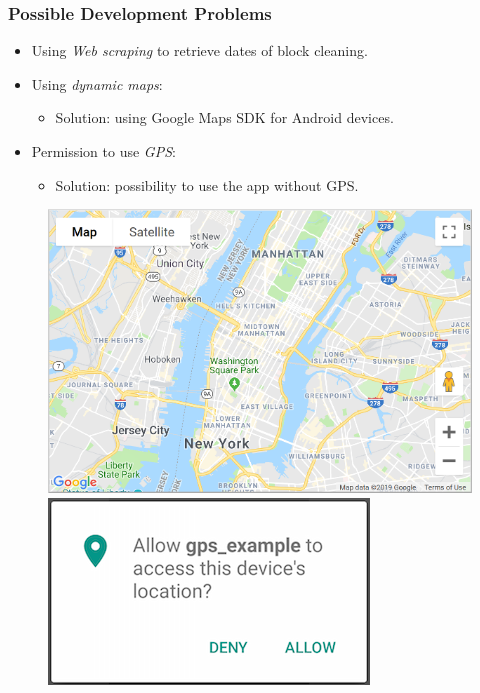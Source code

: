 \documentclass[10pt,xcolor=pdflatex,hyperref={unicode}]{beamer}
\begin{document}
\begin{frame}\frametitle{Possible Development Problems}
    \doublespacing
    \begin{itemize}
        \item Using \emph{Web scraping} to retrieve dates of block cleaning.
        \item Using \emph{dynamic maps}:
            \begin{itemize}
                \item \alert{Solution}: using Google Maps SDK for Android devices.
            \end{itemize}
            
        \item Permission to use \emph{GPS}:
            \begin{itemize}
                \item \alert{Solution}: possibility to use the app without GPS.
            \end{itemize}
    \end{itemize}
        
    \begin{figure}
        \centering
        \begin{minipage}{0.5\textwidth}
            \includegraphics[width=0.5\paperwidth]{img/block-cleaning-2.png}
        \end{minipage}
        \hfill
        \begin{minipage}{0.35\textwidth}
            \raggedleft
            \includegraphics[width=0.3\paperwidth]{img/block-cleaning-3.png}
        \end{minipage}
    \end{figure}
\end{frame}
\end{document}
